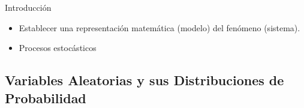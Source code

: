 \documentclass[10pt, envcountsect, handout, aspectratio=1610, hyperref={hypertexnames=true}]{beamer}
\begin{document}
\begin{frame}{Introducción}
\begin{itemize}
\begin{itemize}
\item {} Establecer una representación matemática (modelo) del fenómeno (sistema). 

\item {} Procesos estocásticos 
\end{itemize}
\end{itemize}

\end{frame}




\subsection{Variables Aleatorias y sus Distribuciones de Probabilidad}
\end{document}
